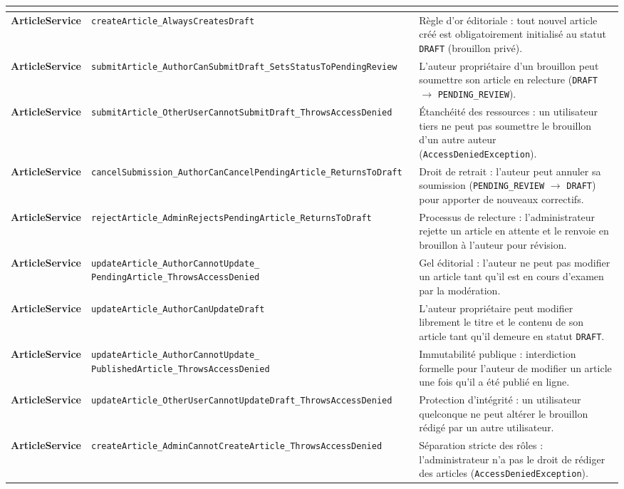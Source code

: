 \documentclass[11pt,a4paper]{article}
\newcommand{\testmethod}[1]{{\ttfamily\scriptsize\nolinkurl{#1}}}
\begin{document}
\begin{longtable}{|>{\raggedright\arraybackslash\bfseries}p{2.7cm}|>{\raggedright\arraybackslash}p{4.8cm}|>{\raggedright\arraybackslash}p{7.2cm}|}
\multicolumn{3}{|l|}{\cellcolor{gray!20}\textbf{3. Service des articles et gouvernance éditoriale (\texttt{ArticleServiceTest} - 13 tests)}} \\
\hline
ArticleService & \testmethod{createArticle_AlwaysCreatesDraft} & Règle d'or éditoriale : tout nouvel article créé est obligatoirement initialisé au statut \texttt{DRAFT} (brouillon privé). \\
\hline
ArticleService & \testmethod{submitArticle_AuthorCanSubmitDraft_SetsStatusToPendingReview} & L'auteur propriétaire d'un brouillon peut soumettre son article en relecture (\texttt{DRAFT} $\to$ \texttt{PENDING\_REVIEW}). \\
\hline
ArticleService & \testmethod{submitArticle_OtherUserCannotSubmitDraft_ThrowsAccessDenied} & Étanchéité des ressources : un utilisateur tiers ne peut pas soumettre le brouillon d'un autre auteur (\texttt{AccessDeniedException}). \\
\hline
ArticleService & \testmethod{cancelSubmission_AuthorCanCancelPendingArticle_ReturnsToDraft} & Droit de retrait : l'auteur peut annuler sa soumission (\texttt{PENDING\_REVIEW} $\to$ \texttt{DRAFT}) pour apporter de nouveaux correctifs. \\
\hline
ArticleService & \testmethod{rejectArticle_AdminRejectsPendingArticle_ReturnsToDraft} & Processus de relecture : l'administrateur rejette un article en attente et le renvoie en brouillon à l'auteur pour révision. \\
\hline
ArticleService & \testmethod{updateArticle_AuthorCannotUpdate_} \testmethod{PendingArticle_ThrowsAccessDenied} & Gel éditorial : l'auteur ne peut pas modifier un article tant qu'il est en cours d'examen par la modération. \\
\hline
ArticleService & \testmethod{updateArticle_AuthorCanUpdateDraft} & L'auteur propriétaire peut modifier librement le titre et le contenu de son article tant qu'il demeure en statut \texttt{DRAFT}. \\
\hline
ArticleService & \testmethod{updateArticle_AuthorCannotUpdate_} \testmethod{PublishedArticle_ThrowsAccessDenied} & Immutabilité publique : interdiction formelle pour l'auteur de modifier un article une fois qu'il a été publié en ligne. \\
\hline
ArticleService & \testmethod{updateArticle_OtherUserCannotUpdateDraft_ThrowsAccessDenied} & Protection d'intégrité : un utilisateur quelconque ne peut altérer le brouillon rédigé par un autre utilisateur. \\
\hline
ArticleService & \testmethod{createArticle_AdminCannotCreateArticle_ThrowsAccessDenied} & Séparation stricte des rôles : l'administrateur n'a pas le droit de rédiger des articles (\texttt{AccessDeniedException}). \\

\end{longtable}
\end{document}
